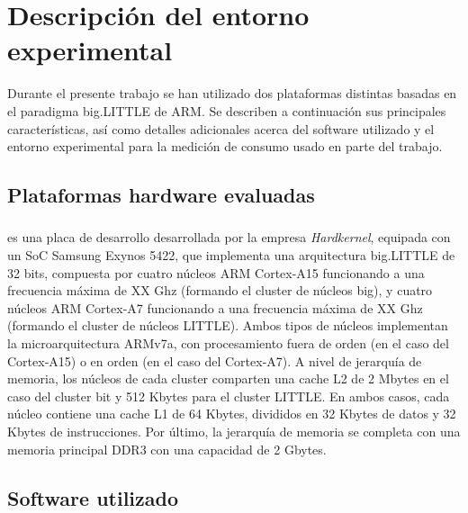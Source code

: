 \section{Descripción del entorno experimental}

Durante el presente trabajo se han utilizado dos plataformas distintas basadas en el paradigma big.LITTLE de ARM.
Se describen a continuación sus principales características, así como detalles adicionales acerca del software 
utilizado y el entorno experimental para la medición de consumo usado en parte del trabajo.

\subsection{Plataformas hardware evaluadas}

\subsubsection{\odroid}

\odroid es una placa de desarrollo desarrollada por la empresa {\em Hardkernel}, equipada con un SoC Samsung
Exynos 5422, que implementa una arquitectura big.LITTLE de 32 bits, compuesta por cuatro núcleos ARM Cortex-A15
funcionando a una frecuencia máxima de XX Ghz (formando el cluster de núcleos big), y cuatro núcleos ARM Cortex-A7 funcionando a una frecuencia
máxima de XX Ghz (formando el cluster de núcleos LITTLE). Ambos tipos de núcleos implementan la microarquitectura
ARMv7a, con procesamiento fuera de orden (en el caso del Cortex-A15) o en orden (en el caso del Cortex-A7). A nivel
de jerarquía de memoria, los núcleos de cada cluster comparten una cache L2 de 2 Mbytes en el caso del cluster bit 
y 512 Kbytes para el cluster LITTLE. En ambos casos, cada núcleo contiene una cache L1 de 64 Kbytes, divididos en 
32 Kbytes de datos y 32 Kbytes de instrucciones. Por último, la jerarquía de memoria se completa con una memoria
principal DDR3 con una capacidad de 2 Gbytes.

\subsubsection{\juno}


\subsection{Software utilizado}

